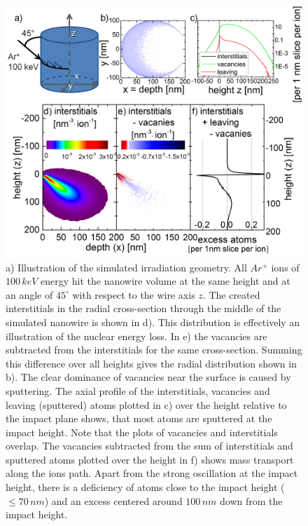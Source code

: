 \documentclass[12pt,
paper=a4,				
DIV=calc,		  %
BCOR=16mm,	  %
headinclude,
openany
]{scrbook}
\begin{document}
\clearpage
\begin{figure}[htbp]
	\centering
		\includegraphics[width=.9\textwidth]{images/deformationBCA.jpg}
		\caption{a) Illustration of the simulated irradiation geometry. All $Ar^+$ ions of $100\,keV$ energy hit the nanowire volume at the same height and at an angle of $45^\circ$ with respect to the wire axis $z$. The created interstitials in the radial cross-section through the middle of the simulated nanowire is shown in d). This distribution is effectively an illustration of the nuclear energy loss. In e) the vacancies are subtracted from the interstitials for the same cross-section. Summing this difference over all heights gives the radial distribution shown in b). The clear dominance of vacancies near the surface is caused by sputtering. The axial profile of the interstitials, vacancies and leaving (sputtered) atoms plotted in c) over the height relative to the impact plane shows, that most atoms are sputtered at the impact height. Note that the plots of vacancies and interstitials overlap. The vacancies subtracted from the sum of interstitials and sputtered atoms plotted over the height in f) shows mass transport along the ions path. Apart from the strong oscillation at the impact height, there is a deficiency of atoms close to the impact height ($\le 70\,nm$) and an excess centered around $100\,nm$ down from the impact height.} 
	\label{deformationBCA}	
\end{figure}
\end{document}
